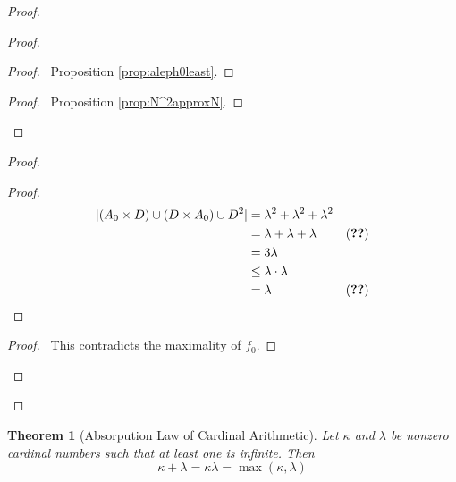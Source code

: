 \documentclass{book}
\let\qed\relax
\newtheorem{thm}[ax]{Theorem}
\theoremstyle{definition}
\begin{document}
\begin{proof}
\begin{proof}
	\begin{proof}
		\pf\ Proposition \ref{prop:aleph0least}.
	\end{proof}
	\begin{proof}
		\pf\ Proposition \ref{prop:N^2approxN}.
	\end{proof}
\end{proof}
\begin{proof}
	\begin{proof}
		\pf
		\begin{align*}
			|(A_0 \times D) \cup (D \times A_0) \cup D^2| & = \lambda^2 + \lambda^2 + \lambda^2 \\
			& = \lambda + \lambda + \lambda & (\text{\stepref{9}}) \\
			& = 3 \lambda \\
			& \leq \lambda \cdot \lambda \\
			& = \lambda & (\text{\stepref{9}})
		\end{align*}
	\end{proof}
	\qedstep
	\begin{proof}
		\pf\ This contradicts the maximality of $f_0$.
	\end{proof}
\end{proof}
\qed
\end{proof}

\begin{thm}[Absorpution Law of Cardinal Arithmetic]
Let $\kappa$ and $\lambda$ be nonzero cardinal numbers such that at least one is infinite. Then
\[ \kappa + \lambda = \kappa \lambda = \max(\kappa, \lambda) \]
\end{thm}
\end{document}
